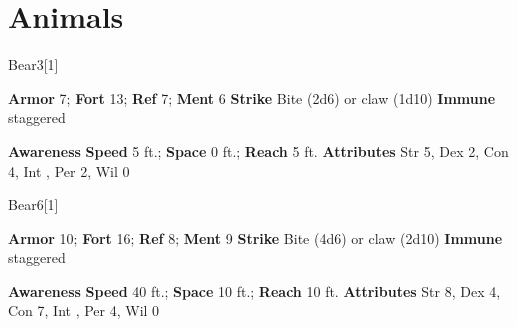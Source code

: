 \section{Animals}
\begin{monsection}[Black]{Bear}{3}[1]
\vspace{-1em}\vspace{-1em}
\begin{spellcontent}
\begin{spelltargetinginfo}
\pari \textbf{Armor} 7; \textbf{Fort} 13; \textbf{Ref} 7; \textbf{Ment} 6
\pari \textbf{Strike} Bite  (2d6) or claw  (1d10)
\pari \textbf{Immune} staggered
\end{spelltargetinginfo}
\end{spellcontent}
\begin{spellsubcontent}
\begin{spellfooter}
\pari \textbf{Awareness} 
\pari \textbf{Speed} 5 ft.; \textbf{Space} 0 ft.; \textbf{Reach} 5 ft.
\pari \textbf{Attributes} Str 5, Dex 2, Con 4, Int , Per 2, Wil 0
\end{spellfooter}
\end{spellsubcontent}
\end{monsection}
\begin{monsection}[Brown]{Bear}{6}[1]
\vspace{-1em}\vspace{-1em}
\begin{spellcontent}
\begin{spelltargetinginfo}
\pari \textbf{Armor} 10; \textbf{Fort} 16; \textbf{Ref} 8; \textbf{Ment} 9
\pari \textbf{Strike} Bite  (4d6) or claw  (2d10)
\pari \textbf{Immune} staggered
\end{spelltargetinginfo}
\end{spellcontent}
\begin{spellsubcontent}
\begin{spellfooter}
\pari \textbf{Awareness} 
\pari \textbf{Speed} 40 ft.; \textbf{Space} 10 ft.; \textbf{Reach} 10 ft.
\pari \textbf{Attributes} Str 8, Dex 4, Con 7, Int , Per 4, Wil 0
\end{spellfooter}
\end{spellsubcontent}
\end{monsection}
